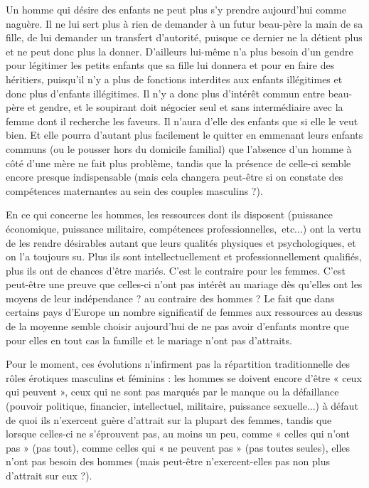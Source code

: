  Un homme qui désire des enfants ne peut plus s'y prendre aujourd'hui comme naguère. Il ne lui sert plus à rien de demander à un futur beau-père la main de sa fille, de lui demander un transfert d'autorité, puisque ce dernier ne la détient plus et ne peut donc plus la donner. D'ailleurs lui-même n'a plus besoin d'un gendre pour légitimer les petits enfants que sa fille lui donnera et pour en faire des héritiers, puisqu'il n'y a plus de fonctions interdites aux enfants illégitimes et donc plus d'enfants illégitimes. Il n'y a donc plus d'intérêt commun entre beau-père et gendre, et le soupirant doit négocier seul et sans intermédiaire avec la femme dont il recherche les faveurs. Il n'aura d'elle des enfants que si elle le veut bien. Et elle pourra d'autant plus facilement le quitter en emmenant leurs enfants communs (ou le pousser hors du domicile familial) que l'absence d'un homme à côté d'une mère ne fait plus problème, tandis que la présence de celle-ci semble encore presque indispensable (mais cela changera peut-être si on constate des compétences maternantes au sein des couples masculins ?). 
 
 En ce qui concerne les hommes, les ressources dont ils disposent (puissance économique, puissance militaire, compétences professionnelles,~etc...) ont la vertu de les rendre désirables autant que leurs qualités physiques et psychologiques, et on l'a toujours su. Plus ils sont intellectuellement et professionnellement qualifiés, plus ils ont de chances d'être mariés. C'est le contraire pour les femmes. C'est peut-être une preuve que celles-ci n'ont pas intérêt au mariage dès qu'elles ont les moyens de leur indépendance ? au contraire des hommes ? Le fait que dans certains pays d'Europe un nombre significatif de femmes aux ressources au dessus de la moyenne semble choisir aujourd'hui de ne pas avoir d'enfants montre que pour elles en tout cas la famille et le mariage n'ont pas d'attraits. 
 
 Pour le moment, ces évolutions n'infirment pas la répartition traditionnelle des rôles érotiques masculins et féminins : les hommes se doivent encore d'être « ceux qui peuvent », ceux qui ne sont pas marqués par le manque ou la défaillance (pouvoir politique, financier, intellectuel, militaire, puissance sexuelle...) à défaut de quoi ils n'exercent guère d'attrait sur la plupart des femmes, tandis que lorsque celles-ci ne s'éprouvent pas, au moins un peu, comme « celles qui n'ont pas » (pas tout), comme celles qui « ne peuvent pas » (pas toutes seules), elles n'ont pas besoin des hommes (mais peut-être n'exercent-elles pas non plus d'attrait sur eux ?).
 
